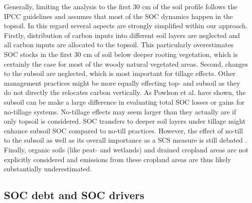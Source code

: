 \documentclass[gc, manuscript]{copernicus}
\begin{document}
Generally, limiting the analysis to the first 30 cm of the soil profile follows the IPCC guidelines \citep{eggleston_ipcc_2006, calvo_buendia_ipcc_2019} and assumes that most of the SOC dynamics happen in the topsoil. In this regard several aspects are strongly simplified within our approach. Firstly, distribution of carbon inputs into different soil layers are neglected and all carbon inputs are allocated to the topsoil. This particularly overestimates SOC stocks in the first 30 cm of soil below deeper rooting vegetation, which is certainly the case for most of the woody natural vegetated areas. Second, changes to the subsoil are neglected, which is most important for tillage effects. Other management practices might be more equally effecting top- and subsoil as they do not directly the relocates carbon vertically. As Powlson et al. \citeyearpar{powlson_limited_2014} have shown, the subsoil can be make a large difference in evaluating total SOC losses or gains for no-tillage systems. No-tillage effects may seem larger than they actually are if only topsoil is considered. SOC transfers to deeper soil layers under tillage might enhance subsoil SOC compared to no-till practices. However, the effect of no-till to the subsoil as well as its overall importance as a SCS measure is still debated \citep{ogle_climate_2019}. Finally, organic soils (like peat- and wetlands) and drained cropland areas are not explicitly considered and emissions from these cropland areas are thus likely substantially underestimated.

\hypertarget{soc-debt-and-soc-drivers}{%
\subsection{SOC debt and SOC drivers}\label{soc-debt-and-soc-drivers}}
\end{document}
